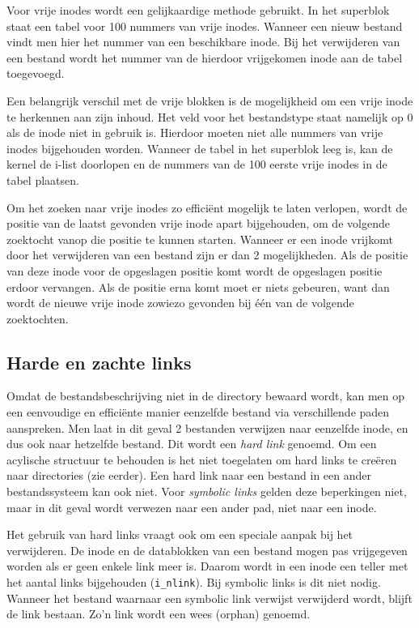 Voor vrije inodes wordt een gelijkaardige methode gebruikt. In het superblok staat een tabel voor 100 nummers van
vrije inodes.  Wanneer een nieuw bestand vindt men hier het nummer van een beschikbare inode. Bij het verwijderen
van een bestand wordt het nummer van de hierdoor vrijgekomen inode aan de tabel toegevoegd.

Een belangrijk verschil met de vrije blokken is de mogelijkheid om een vrije inode te herkennen aan zijn inhoud. Het
veld voor het bestandstype staat namelijk op 0 als de inode niet in gebruik is. Hierdoor moeten niet alle nummers van
vrije inodes bijgehouden worden. Wanneer de tabel in het superblok leeg is, kan de kernel de i-list doorlopen en de
nummers van de 100 eerste vrije inodes in de tabel plaatsen.

Om het zoeken naar vrije inodes zo effici\"ent mogelijk te laten verlopen, wordt de positie van de laatst gevonden
vrije inode apart bijgehouden, om de volgende zoektocht vanop die positie te kunnen starten. Wanneer er een inode
vrijkomt door het verwijderen van een bestand zijn er dan 2 mogelijkheden. Als de positie van deze inode voor de
opgeslagen positie komt wordt de opgeslagen positie erdoor vervangen. Als de positie erna komt moet er niets gebeuren,
want dan wordt de nieuwe vrije inode zowiezo gevonden bij \'e\'en van de volgende zoektochten.

\subsection{Harde en zachte links}

Omdat de bestandsbeschrijving niet in de directory bewaard wordt, kan men op een eenvoudige en effici\"ente
manier eenzelfde bestand via verschillende paden aanspreken. Men laat in dit geval 2 bestanden verwijzen
naar eenzelfde inode, en dus ook naar hetzelfde bestand. Dit wordt een \emph{hard link} genoemd. Om een
acylische structuur te behouden is het niet toegelaten om hard links te cre\"eren naar directories
(zie eerder). Een hard link naar een bestand in een ander bestandssysteem kan ook niet. Voor
\emph{symbolic links} gelden deze beperkingen niet, maar in dit geval wordt verwezen naar een ander pad,
niet naar een inode.

Het gebruik van hard links vraagt ook om een speciale aanpak bij het verwijderen. De inode en de datablokken van
een bestand mogen pas vrijgegeven worden als er geen enkele link meer is. Daarom wordt in een inode een teller
met het aantal links bijgehouden (\verb|i_nlink|). Bij symbolic links is dit niet nodig. Wanneer het bestand
waarnaar een symbolic link verwijst verwijderd wordt, blijft de link bestaan. Zo'n link wordt een wees (orphan)
genoemd.

